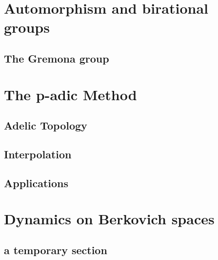 \documentclass[sectionlevel=book,status=draft]{noteformyself}
\begin{document}
    \chapter[
      status=draft,
      tag=000,
      label=\labelNFM{chap:automorphism-and-birational-groups}
    ]{Automorphism and birational groups}
        \section[
          status=draft,
          tag=00000,
          label=\labelNFM{sec:automorphism-and-birational-groups:the-gremona-group}
        ]{The Gremona group}
        

    \chapter[
      status=draft,
      tag=000,
      label=\labelNFM{chap:p-adic-method}
    ]{The p-adic Method}
        \section[
          status=draft,
          tag=00000,
          label=\labelNFM{sec:p-adic-method:adelic-topology}
        ]{Adelic Topology}
        
        \section[
          status=draft,
          tag=00000,
          label=\labelNFM{sec:p-adic-method:interpolation}
        ]{Interpolation}
        
        \section[
          status=draft,
          tag=00000,
          label=\labelNFM{sec:p-adic-method:applications}
        ]{Applications}
        

    \chapter[
      status=draft,
      tag=000,
      label=\labelNFM{chap:dynamics-on-berkovich-spaces}
    ]{Dynamics on Berkovich spaces}
        \section[
          status=draft,
          tag=00000,
          label=\labelNFM{sec:dynamics-on-berkovich-spaces:a-theorem-for-attractor-of-endomorphism-on-k-affinoid-spaces}
        ]{a temporary section}
        

   \printbibliography[heading=bibintoc, title={References}] %
\end{document}

